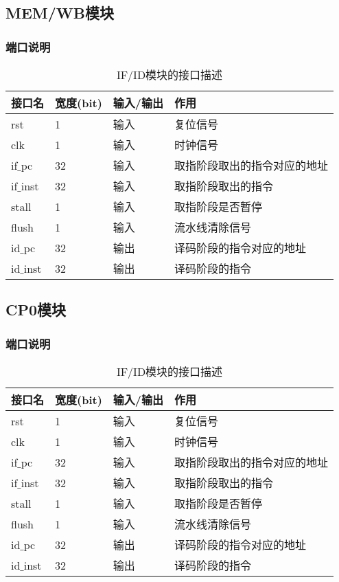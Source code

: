 \subsection{MEM/WB模块}
\subsubsection{端口说明}
\begin{table}[H]
	\centering
	\caption{IF/ID模块的接口描述}
	\begin{tabular}{|l|l|l|l|}
		\hline
		接口名 & 宽度(bit) & 输入/输出 & 作用 \\
		\hline
		rst & 1 & 输入 & 复位信号 \\
		\hline
		clk & 1 & 输入 & 时钟信号 \\
		\hline
		if$\_$pc & 32 & 输入 & 取指阶段取出的指令对应的地址 \\
		\hline
		if$\_$inst & 32 & 输入 & 取指阶段取出的指令 \\
		\hline
		stall & 1 & 输入 & 取指阶段是否暂停 \\
		\hline
		flush & 1 & 输入 & 流水线清除信号 \\
		\hline
		id$\_$pc & 32 & 输出 & 译码阶段的指令对应的地址 \\
		\hline
		id$\_$inst & 32 & 输出 & 译码阶段的指令 \\
		\hline
	\end{tabular}
\end{table}
\subsection{CP0模块}
\subsubsection{端口说明}
\begin{table}[H]
	\centering
	\caption{IF/ID模块的接口描述}
	\begin{tabular}{|l|l|l|l|}
		\hline
		接口名 & 宽度(bit) & 输入/输出 & 作用 \\
		\hline
		rst & 1 & 输入 & 复位信号 \\
		\hline
		clk & 1 & 输入 & 时钟信号 \\
		\hline
		if$\_$pc & 32 & 输入 & 取指阶段取出的指令对应的地址 \\
		\hline
		if$\_$inst & 32 & 输入 & 取指阶段取出的指令 \\
		\hline
		stall & 1 & 输入 & 取指阶段是否暂停 \\
		\hline
		flush & 1 & 输入 & 流水线清除信号 \\
		\hline
		id$\_$pc & 32 & 输出 & 译码阶段的指令对应的地址 \\
		\hline
		id$\_$inst & 32 & 输出 & 译码阶段的指令 \\
		\hline
	\end{tabular}
\end{table}
